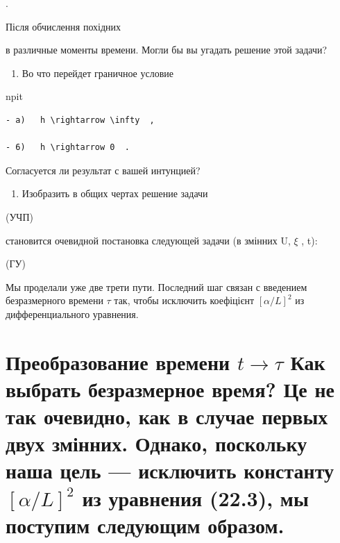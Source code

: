 \documentclass[
  ukrainian,
]{article}
\providecommand{\tightlist}{%
  \setlength{\itemsep}{0pt}\setlength{\parskip}{0pt}}
\begin{document}
.

Після обчислення похідних

в различные моменты времени. Могли бы вы угадать решение этой задачи?

\begin{enumerate}
\def\labelenumi{\arabic{enumi}.}
\setcounter{enumi}{2}
\tightlist
\item
  Во что перейдет граничное условие
\end{enumerate}

npit

\begin{verbatim}
- a)   h \rightarrow \infty  ,

- 6)   h \rightarrow 0  .
\end{verbatim}

Согласуется ли результат с вашей интунцией?

\begin{enumerate}
\def\labelenumi{\arabic{enumi}.}
\setcounter{enumi}{3}
\tightlist
\item
  Изобразить в общих чертах решение задачи
\end{enumerate}

(УЧП)

становится очевидной постановка следующей задачи (в змінних U, \(\xi\) ,
t):

(ГУ)

Мы проделали уже две трети пути. Последний шаг связан с введением
безразмерного времени \(\tau\) так, чтобы исключить коефіцієнт
\([\alpha/L]^2\) из дифференциального уравнения.

\section{\texorpdfstring{Преобразование времени \(t \rightarrow \tau\)
Как выбрать безразмерное время? Це не так очевидно, как в случае первых
двух змінних. Однако, поскольку наша цель --- исключить константу
\([\alpha/L]^2\) из уравнения (22.3), мы поступим следующим
образом.}{Преобразование времени t \textbackslash rightarrow \textbackslash tau Как выбрать безразмерное время? Це не так очевидно, как в случае первых двух змінних. Однако, поскольку наша цель --- исключить константу {[}\textbackslash alpha/L{]}\^{}2 из уравнения (22.3), мы поступим следующим образом.}}\label{ux43fux440ux435ux43eux431ux440ux430ux437ux43eux432ux430ux43dux438ux435-ux432ux440ux435ux43cux435ux43dux438-t-rightarrow-tau-ux43aux430ux43a-ux432ux44bux431ux440ux430ux442ux44c-ux431ux435ux437ux440ux430ux437ux43cux435ux440ux43dux43eux435-ux432ux440ux435ux43cux44f-ux446ux435-ux43dux435-ux442ux430ux43a-ux43eux447ux435ux432ux438ux434ux43dux43e-ux43aux430ux43a-ux432-ux441ux43bux443ux447ux430ux435-ux43fux435ux440ux432ux44bux445-ux434ux432ux443ux445-ux437ux43cux456ux43dux43dux438ux445.-ux43eux434ux43dux430ux43aux43e-ux43fux43eux441ux43aux43eux43bux44cux43aux443-ux43dux430ux448ux430-ux446ux435ux43bux44c-ux438ux441ux43aux43bux44eux447ux438ux442ux44c-ux43aux43eux43dux441ux442ux430ux43dux442ux443-alphal2-ux438ux437-ux443ux440ux430ux432ux43dux435ux43dux438ux44f-22.3-ux43cux44b-ux43fux43eux441ux442ux443ux43fux438ux43c-ux441ux43bux435ux434ux443ux44eux449ux438ux43c-ux43eux431ux440ux430ux437ux43eux43c.}
\end{document}
